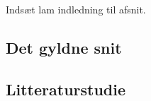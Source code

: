 \textsf{
Indsæt lam indledning til afsnit.
}

\subsection{Det gyldne snit}


\subsection{Litteraturstudie}


